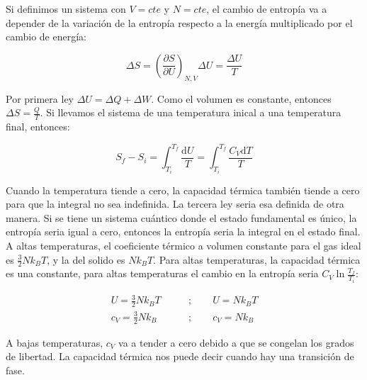 \documentclass[11pt,fleqn]{book}
\begin{document}
Si definimos un sistema con $V=cte$ y $N=cte$, el cambio de entropía va a depender de la variación de la entropía respecto a la energía multiplicado por el cambio de energía:

\begin{equation}
    \Delta S=\left(\frac{\partial S}{\partial U}\right)_{N,V}\Delta U= \frac{\Delta U}{T}
    \label{Eq. 3.27}
\end{equation}

Por primera ley $\Delta U=\Delta Q+ \Delta W$. Como el volumen es constante, entonces $\Delta S=\frac{Q}{T}$. Si llevamos el sistema de una temperatura inical a una temperatura final, entonces:

\begin{equation}
    S_{f}-S_{i}=\int_{T_{i}}^{T_{f}} \frac{\mathrm{d} U}{T}=\int_{T_{i}}^{T_{f}} \frac{C_{V}\mathrm{d} T}{T}
    \label{Eq. 3.28}
\end{equation}

Cuando la temperatura tiende a cero, la capacidad térmica también tiende a cero para que la integral no sea indefinida.  La tercera ley seria esa definida de otra manera. Si se tiene un sistema cuántico donde el estado fundamental es único, la entropía seria igual a cero,  entonces la entropía seria la integral en el estado final. A altas temperaturas, el coeficiente térmico a volumen constante para el gas ideal  es $\frac{3}{2}Nk_{B}T$, y la del solido es $Nk_{B}T$. Para altas temperaturas, la capacidad térmica es una constante, para altas temperaturas el cambio en la entropía seria $C_{V}\ln{\frac{T_{f}}{T_{i}}}$:

\begin{equation*}
    \begin{split}
        U=\frac{3}{2}Nk_{B}T\qquad&;\qquad U=Nk_{B}T\\
        c_{V}=\frac{3}{2}Nk_{B}\qquad&;\qquad c_{V}=Nk_{B}
    \end{split}
\end{equation*}

A bajas temperaturas, $c_{V}$ va a tender a cero debido a que se congelan los grados de libertad. La capacidad térmica nos puede decir cuando hay una transición de fase.
\end{document}
